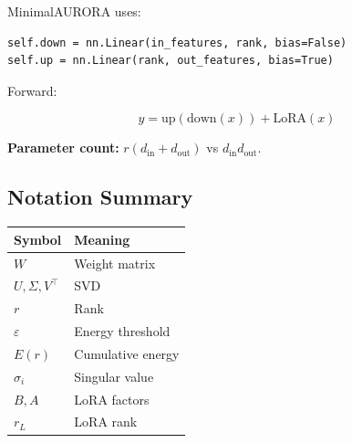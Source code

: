 MinimalAURORA uses:

\begin{lstlisting}
self.down = nn.Linear(in_features, rank, bias=False)
self.up = nn.Linear(rank, out_features, bias=True)
\end{lstlisting}

Forward:

\[
y = \text{up}(\text{down}(x)) + \text{LoRA}(x)
\tag{3.6}
\]

\textbf{Parameter count:} $r(d_\text{in} + d_\text{out})$ vs $d_\text{in} d_\text{out}$.

\subsection{Notation Summary}

\begin{table}[H]
\centering
\small
\begin{tabular}{ll}
\toprule
\textbf{Symbol} & \textbf{Meaning} \\
\midrule
$W$ & Weight matrix \\
$U, \Sigma, V^\top$ & SVD \\
$r$ & Rank \\
$\varepsilon$ & Energy threshold \\
$E(r)$ & Cumulative energy \\
$\sigma_i$ & Singular value \\
$B, A$ & LoRA factors \\
$r_L$ & LoRA rank \\
\bottomrule
\end{tabular}
\end{table}

